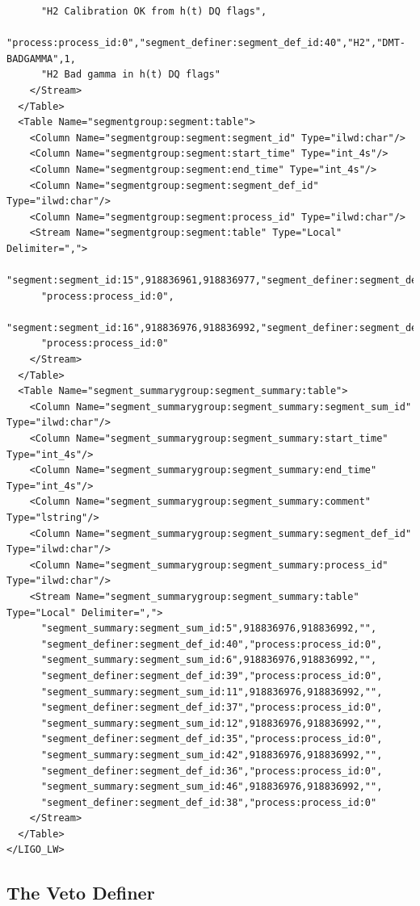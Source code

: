 {\begin{verbatim}
      "H2 Calibration OK from h(t) DQ flags",
      "process:process_id:0","segment_definer:segment_def_id:40","H2","DMT-BADGAMMA",1,
      "H2 Bad gamma in h(t) DQ flags"
    </Stream>
  </Table>
  <Table Name="segmentgroup:segment:table">
    <Column Name="segmentgroup:segment:segment_id" Type="ilwd:char"/>
    <Column Name="segmentgroup:segment:start_time" Type="int_4s"/>
    <Column Name="segmentgroup:segment:end_time" Type="int_4s"/>
    <Column Name="segmentgroup:segment:segment_def_id" Type="ilwd:char"/>
    <Column Name="segmentgroup:segment:process_id" Type="ilwd:char"/>
    <Stream Name="segmentgroup:segment:table" Type="Local" Delimiter=",">
      "segment:segment_id:15",918836961,918836977,"segment_definer:segment_def_id:35",
      "process:process_id:0",
      "segment:segment_id:16",918836976,918836992,"segment_definer:segment_def_id:37",
      "process:process_id:0"
    </Stream>
  </Table>
  <Table Name="segment_summarygroup:segment_summary:table">
    <Column Name="segment_summarygroup:segment_summary:segment_sum_id" Type="ilwd:char"/>
    <Column Name="segment_summarygroup:segment_summary:start_time" Type="int_4s"/>
    <Column Name="segment_summarygroup:segment_summary:end_time" Type="int_4s"/>
    <Column Name="segment_summarygroup:segment_summary:comment" Type="lstring"/>
    <Column Name="segment_summarygroup:segment_summary:segment_def_id" Type="ilwd:char"/>
    <Column Name="segment_summarygroup:segment_summary:process_id" Type="ilwd:char"/>
    <Stream Name="segment_summarygroup:segment_summary:table" Type="Local" Delimiter=",">
      "segment_summary:segment_sum_id:5",918836976,918836992,"",
      "segment_definer:segment_def_id:40","process:process_id:0",
      "segment_summary:segment_sum_id:6",918836976,918836992,"",
      "segment_definer:segment_def_id:39","process:process_id:0",
      "segment_summary:segment_sum_id:11",918836976,918836992,"",
      "segment_definer:segment_def_id:37","process:process_id:0",
      "segment_summary:segment_sum_id:12",918836976,918836992,"",
      "segment_definer:segment_def_id:35","process:process_id:0",
      "segment_summary:segment_sum_id:42",918836976,918836992,"",
      "segment_definer:segment_def_id:36","process:process_id:0",
      "segment_summary:segment_sum_id:46",918836976,918836992,"",
      "segment_definer:segment_def_id:38","process:process_id:0"
    </Stream>
  </Table>
</LIGO_LW>
\end{verbatim}
}

\subsection{The Veto Definer}

